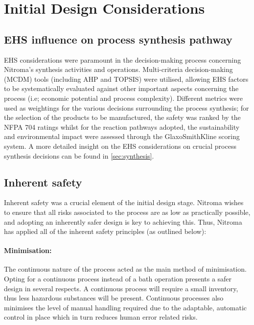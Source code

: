  
\section{Initial Design Considerations}

\subsection{EHS influence on process synthesis pathway}

EHS considerations were paramount in the decision-making process concerning Nitroma’s synthesis activities and operations. Multi-criteria decision-making (MCDM) tools (including AHP and TOPSIS) were utilised, allowing EHS factors to be systematically evaluated against other important aspects concerning the process (i.e; economic potential and process complexity). Different metrics were used as weightings for the various decisions surrounding the process synthesis; for the selection of the products to be manufactured, the safety was ranked by the NFPA 704 ratings whilst for the reaction pathways adopted, the sustainability and environmental impact were assessed through the GlaxoSmithKline scoring system. A more detailed insight on the EHS considerations on crucial process synthesis decisions can be found in \cref{sec:synthesis}. 

\subsection{Inherent safety}

Inherent safety was a crucial element of the initial design stage. Nitroma wishes to ensure that all risks associated to the process are as low as practically possible, and adopting an inherently safer design is key to achieving this. Thus, Nitroma has applied all of the inherent safety principles (as outlined below): 

\paragraph{Minimisation:} The continuous nature of the process acted as the main method of minimisation. Opting for a continuous process instead of a bath operation presents a safer design in several respects. A continuous process will require a small inventory, thus less hazardous substances will be present. Continuous processes also minimises the level of manual handling required due to the adaptable, automatic control in place which in turn reduces human error related risks.  



